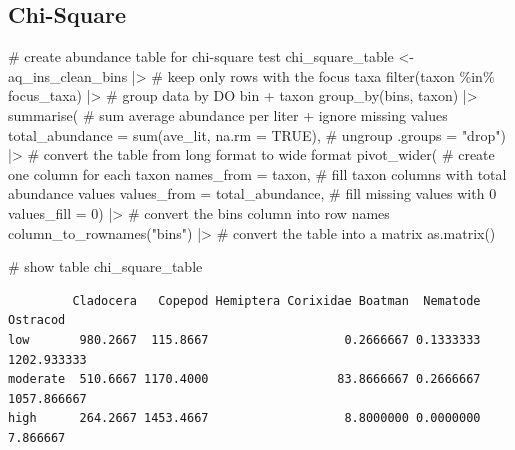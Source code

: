 \documentclass[
  letterpaper,
  DIV=11,
  numbers=noendperiod]{scrartcl}
\newenvironment{Shaded}{\begin{snugshade}}{\end{snugshade}}
\newcommand{\AttributeTok}[1]{\textcolor[rgb]{0.40,0.45,0.13}{#1}}
\newcommand{\CommentTok}[1]{\textcolor[rgb]{0.37,0.37,0.37}{#1}}
\newcommand{\ConstantTok}[1]{\textcolor[rgb]{0.56,0.35,0.01}{#1}}
\newcommand{\DecValTok}[1]{\textcolor[rgb]{0.68,0.00,0.00}{#1}}
\newcommand{\FunctionTok}[1]{\textcolor[rgb]{0.28,0.35,0.67}{#1}}
\newcommand{\NormalTok}[1]{\textcolor[rgb]{0.00,0.23,0.31}{#1}}
\newcommand{\OtherTok}[1]{\textcolor[rgb]{0.00,0.23,0.31}{#1}}
\newcommand{\SpecialCharTok}[1]{\textcolor[rgb]{0.37,0.37,0.37}{#1}}
\newcommand{\StringTok}[1]{\textcolor[rgb]{0.13,0.47,0.30}{#1}}
\begin{document}
\subsection{Chi-Square}\label{chi-square}

\begin{Shaded}
\begin{Highlighting}[]
\CommentTok{\# create abundance table for chi{-}square test}
\NormalTok{chi\_square\_table }\OtherTok{\textless{}{-}}\NormalTok{ aq\_ins\_clean\_bins }\SpecialCharTok{|\textgreater{}}
  \CommentTok{\# keep only rows with the focus taxa}
  \FunctionTok{filter}\NormalTok{(taxon }\SpecialCharTok{\%in\%}\NormalTok{ focus\_taxa) }\SpecialCharTok{|\textgreater{}}
  \CommentTok{\# group data by DO bin + taxon}
  \FunctionTok{group\_by}\NormalTok{(bins, taxon) }\SpecialCharTok{|\textgreater{}}
  \FunctionTok{summarise}\NormalTok{(}
    \CommentTok{\# sum average abundance per liter + ignore missing values}
    \AttributeTok{total\_abundance =} \FunctionTok{sum}\NormalTok{(ave\_lit, }\AttributeTok{na.rm =} \ConstantTok{TRUE}\NormalTok{),}
    \CommentTok{\# ungroup}
    \AttributeTok{.groups =} \StringTok{"drop"}\NormalTok{) }\SpecialCharTok{|\textgreater{}}
  \CommentTok{\# convert the table from long format to wide format}
  \FunctionTok{pivot\_wider}\NormalTok{(}
    \CommentTok{\# create one column for each taxon}
    \AttributeTok{names\_from =}\NormalTok{ taxon,}
    \CommentTok{\# fill taxon columns with total abundance values}
    \AttributeTok{values\_from =}\NormalTok{ total\_abundance,}
    \CommentTok{\# fill missing values with 0}
    \AttributeTok{values\_fill =} \DecValTok{0}\NormalTok{) }\SpecialCharTok{|\textgreater{}}
  \CommentTok{\# convert the bins column into row names}
  \FunctionTok{column\_to\_rownames}\NormalTok{(}\StringTok{"bins"}\NormalTok{) }\SpecialCharTok{|\textgreater{}}
  \CommentTok{\# convert the table into a matrix}
  \FunctionTok{as.matrix}\NormalTok{()}

\CommentTok{\# show table}
\NormalTok{chi\_square\_table}
\end{Highlighting}
\end{Shaded}

\begin{verbatim}
         Cladocera   Copepod Hemiptera Corixidae Boatman  Nematode    Ostracod
low       980.2667  115.8667                   0.2666667 0.1333333 1202.933333
moderate  510.6667 1170.4000                  83.8666667 0.2666667 1057.866667
high      264.2667 1453.4667                   8.8000000 0.0000000    7.866667
\end{verbatim}
\end{document}

